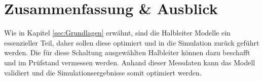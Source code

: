 \chapter{Zusammenfassung \& Ausblick}

Wie in Kapitel \ref{sec:Grundlagen} erwähnt, sind die Halbleiter Modelle ein essenzieller Teil, daher sollen diese optimiert und in die Simulation zurück geführt werden. Die für diese Schaltung ausgewählten Halbleiter können dazu beschafft und im Prüfstand vermessen werden.  Anhand dieser Messdaten kann das Modell validiert und die Simulationsergebnisse somit optimiert werden.


 
 